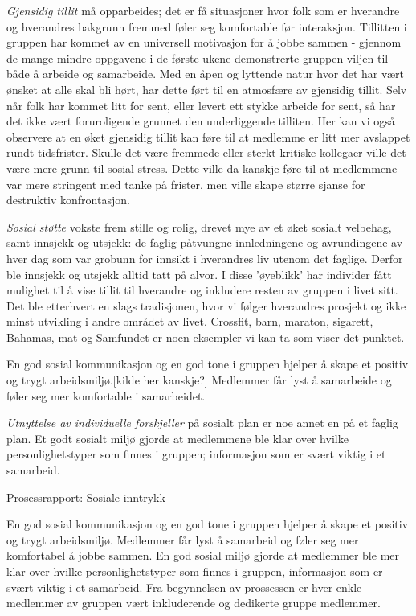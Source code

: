 \emph{Gjensidig tillit} må opparbeides; det er få situasjoner hvor folk som er hverandre og hverandres bakgrunn fremmed føler seg komfortable før interaksjon. Tillitten i gruppen har kommet av en universell motivasjon for å jobbe sammen - gjennom de mange mindre oppgavene i de første ukene demonstrerte gruppen viljen til både å arbeide og samarbeide. Med en åpen og lyttende natur hvor det har vært ønsket at alle skal bli hørt, har dette ført til en atmosfære av gjensidig tillit. Selv når folk har kommet litt for sent, eller levert ett stykke arbeide for sent, så har det ikke vært foruroligende grunnet den underliggende tilliten. Her kan vi også observere at en øket gjensidig tillit kan føre til at medlemme er litt mer avslappet rundt tidsfrister. Skulle det være fremmede eller sterkt kritiske kollegaer ville det være mere grunn til sosial stress. Dette ville da kanskje føre til at medlemmene var mere stringent med tanke på frister, men ville skape større sjanse for destruktiv konfrontasjon. 

\emph{Sosial støtte} vokste frem stille og rolig, drevet mye av et øket sosialt velbehag, samt innsjekk og utsjekk: de faglig påtvungne innledningene og avrundingene av hver dag som var grobunn for innsikt i hverandres liv utenom det faglige. Derfor ble innsjekk og utsjekk alltid tatt på alvor. I disse 'øyeblikk' har individer fått mulighet til å vise tillit til hverandre og inkludere resten av gruppen i livet sitt.
Det ble etterhvert en slags tradisjonen, hvor vi følger hverandres prosjekt og ikke minst utvikling i andre området av livet. Crossfit, barn, maraton, sigarett, Bahamas, mat og Samfundet er noen eksempler vi kan ta som viser det punktet. 


En god sosial kommunikasjon og en god tone i gruppen hjelper å skape et positiv og trygt arbeidsmiljø.[kilde her kanskje?] Medlemmer får lyst å samarbeide og føler seg mer komfortable i samarbeidet. 

\emph{Utnyttelse av individuelle forskjeller} på sosialt plan er noe annet en på et faglig plan. Et godt sosialt miljø gjorde at medlemmene ble klar over hvilke personlighetstyper som finnes i gruppen; informasjon som er svært viktig i et samarbeid.



Prosessrapport: Sosiale inntrykk

En god sosial kommunikasjon og en god tone i gruppen hjelper å skape et positiv og trygt arbeidsmiljø. Medlemmer får lyst å samarbeid og føler seg mer komfortabel å jobbe sammen. En god sosial miljø gjorde at medlemmer ble mer klar over hvilke personlighetstyper som finnes i gruppen, informasjon som er svært viktig i et samarbeid. Fra begynnelsen av prossessen er hver enkle medlemmer av gruppen vært inkluderende og dedikerte gruppe medlemmer. 

